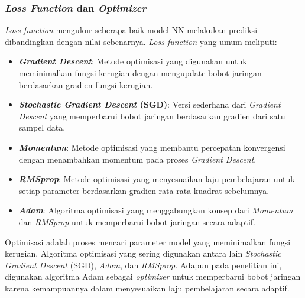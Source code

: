  \subsubsection{\emph{Loss Function} dan \emph{Optimizer}}
 \emph{Loss function} mengukur seberapa baik model NN melakukan prediksi dibandingkan dengan nilai sebenarnya. \emph{Loss function} yang umum meliputi:
 \begin{itemize}[nolistsep]
   \item \textbf{\emph{Gradient Descent}}: Metode optimisasi yang digunakan untuk meminimalkan fungsi kerugian dengan mengupdate bobot jaringan berdasarkan gradien fungsi kerugian.
   \item \textbf{\emph{Stochastic Gradient Descent} (SGD)}: Versi sederhana dari \emph{Gradient Descent} yang memperbarui bobot jaringan berdasarkan gradien dari satu sampel data.
   \item \textbf{\emph{Momentum}}: Metode optimisasi yang membantu percepatan konvergensi dengan menambahkan momentum pada proses \emph{Gradient Descent}.
   \item \textbf{\emph{RMSprop}}: Metode optimisasi yang menyesuaikan laju pembelajaran untuk setiap parameter berdasarkan gradien rata-rata kuadrat sebelumnya.
   \item \textbf{\emph{Adam}}: Algoritma optimisasi yang menggabungkan konsep dari \emph{Momentum} dan \emph{RMSprop} untuk memperbarui bobot jaringan secara adaptif.
 \end{itemize}
 
 Optimisasi adalah proses mencari parameter model yang meminimalkan fungsi kerugian. Algoritma optimisasi yang sering digunakan antara lain \emph{Stochastic Gradient Descent} (SGD), \emph{Adam}, dan \emph{RMSprop}. Adapun pada penelitian ini, digunakan algoritma Adam sebagai \emph{optimizer} untuk memperbarui bobot jaringan karena kemampuannya dalam menyesuaikan laju pembelajaran secara adaptif.
 
